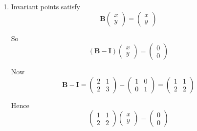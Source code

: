 \documentclass[leqno]{article}
\begin{document}
\begin{enumerate}[
  label=\textbf{\arabic*.},
  leftmargin=*,
  topsep=0pt,
  partopsep=0pt,
  parsep=0pt
]
\begin{tcolorbox}[colback=white, colframe=scarlet, title={\textbf{Solution}}, breakable, grow to left by=6mm, grow to right by=10mm]
\begin{enumerate}[label=\textbf{(\roman*)}]
Setting this equal to $0$ gives
\[
d-b-1=0
\]

Hence
\[
b=d-1
\]

Then
\[
a=b+2=d+1,\qquad c=d
\]

If we choose $d=3$, then
\[
b=2,\qquad a=4,\qquad c=3
\]

So one possible matrix is
\[
\mathbf A=
\begin{pmatrix}
4&2\\
3&3
\end{pmatrix}
\]

A possible matrix is $\displaystyle \begin{pmatrix}4&2\\3&3\end{pmatrix}$.

\item Invariant points satisfy
\[
\mathbf B\begin{pmatrix}x\\y\end{pmatrix}=\begin{pmatrix}x\\y\end{pmatrix}
\]

So
\[
(\mathbf B-\mathbf I)\begin{pmatrix}x\\y\end{pmatrix}=\begin{pmatrix}0\\0\end{pmatrix}
\]

Now
\[
\mathbf B-\mathbf I=
\begin{pmatrix}
2&1\\
2&3
\end{pmatrix}
-
\begin{pmatrix}
1&0\\
0&1
\end{pmatrix}
=
\begin{pmatrix}
1&1\\
2&2
\end{pmatrix}
\]

Hence
\[
\begin{pmatrix}
1&1\\
2&2
\end{pmatrix}
\begin{pmatrix}x\\y\end{pmatrix}
=
\begin{pmatrix}0\\0\end{pmatrix}
\]


\end{enumerate}
\end{tcolorbox}
\end{enumerate}
\end{document}
